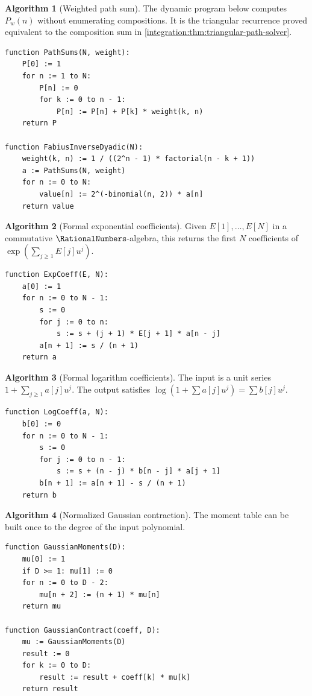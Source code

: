 \documentclass[11pt,oneside]{article}
\theoremstyle{definition}
\newtheorem{algorithm}[algorithm]{Algorithm}
\theoremstyle{remark}
\begin{document}
\begin{algorithm}[Weighted path sum]
\label{integration:alg:path-sum}
The dynamic program below computes $P_w(n)$ without enumerating compositions.  It is the
triangular recurrence proved equivalent to the composition sum in
\cref{integration:thm:triangular-path-solver}.
\end{algorithm}
\begin{lstlisting}[style=pseudo]
function PathSums(N, weight):
    P[0] := 1
    for n := 1 to N:
        P[n] := 0
        for k := 0 to n - 1:
            P[n] := P[n] + P[k] * weight(k, n)
    return P

function FabiusInverseDyadic(N):
    weight(k, n) := 1 / ((2^n - 1) * factorial(n - k + 1))
    a := PathSums(N, weight)
    for n := 0 to N:
        value[n] := 2^(-binomial(n, 2)) * a[n]
    return value
\end{lstlisting}

\begin{algorithm}[Formal exponential coefficients]
\label{integration:alg:expcoeff}
Given $E[1],\ldots,E[N]$ in a commutative $\RationalNumbers$-algebra, this returns the first $N$
coefficients of $\exp(\sum_{j\ge1}E[j]u^j)$.
\end{algorithm}
\begin{lstlisting}[style=pseudo]
function ExpCoeff(E, N):
    a[0] := 1
    for n := 0 to N - 1:
        s := 0
        for j := 0 to n:
            s := s + (j + 1) * E[j + 1] * a[n - j]
        a[n + 1] := s / (n + 1)
    return a
\end{lstlisting}

\begin{algorithm}[Formal logarithm coefficients]
\label{integration:alg:logcoeff}
The input is a unit series $1+\sum_{j\ge1}a[j]u^j$.  The output satisfies
$\log(1+\sum a[j]u^j)=\sum b[j]u^j$.
\end{algorithm}
\begin{lstlisting}[style=pseudo]
function LogCoeff(a, N):
    b[0] := 0
    for n := 0 to N - 1:
        s := 0
        for j := 0 to n - 1:
            s := s + (n - j) * b[n - j] * a[j + 1]
        b[n + 1] := a[n + 1] - s / (n + 1)
    return b
\end{lstlisting}

\begin{algorithm}[Normalized Gaussian contraction]
\label{integration:alg:gaussian-contraction}
The moment table can be built once to the degree of the input polynomial.
\end{algorithm}
\begin{lstlisting}[style=pseudo]
function GaussianMoments(D):
    mu[0] := 1
    if D >= 1: mu[1] := 0
    for n := 0 to D - 2:
        mu[n + 2] := (n + 1) * mu[n]
    return mu

function GaussianContract(coeff, D):
    mu := GaussianMoments(D)
    result := 0
    for k := 0 to D:
        result := result + coeff[k] * mu[k]
    return result
\end{lstlisting}
\end{document}
